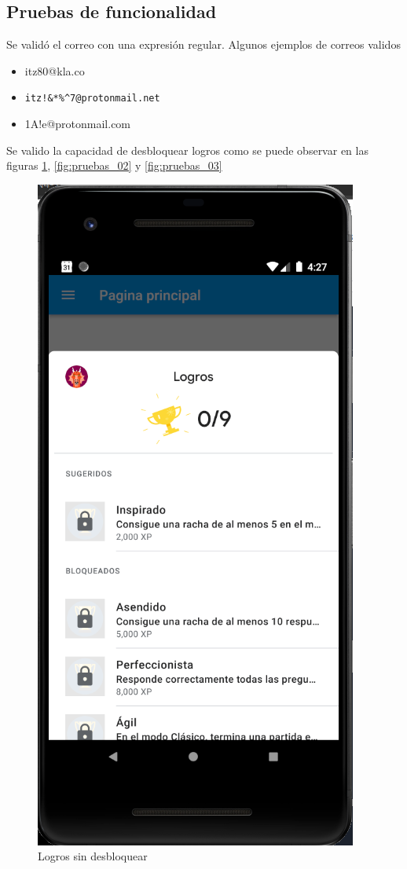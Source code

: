 \documentclass{article}
\begin{document}
\subsection{Pruebas de funcionalidad}
Se validó el correo con una expresión regular. Algunos ejemplos de correos validos
\begin{itemize}
	\item itz80@kla.co
	\item \verb |itz!&*%
	\item 1A!e@protonmail.com
\end{itemize}
Se valido la capacidad de desbloquear logros como se puede observar en las figuras
\ref{fig:pruebas_01}, \ref{fig:pruebas_02} y \ref{fig:pruebas_03}
\begin{figure}[H]
    \centering
    \includegraphics[scale=0.8]{imgs/Imp/Logros}
    \caption{Logros sin desbloquear}
    \label{fig:pruebas_01}
\end{figure}
\end{document}
